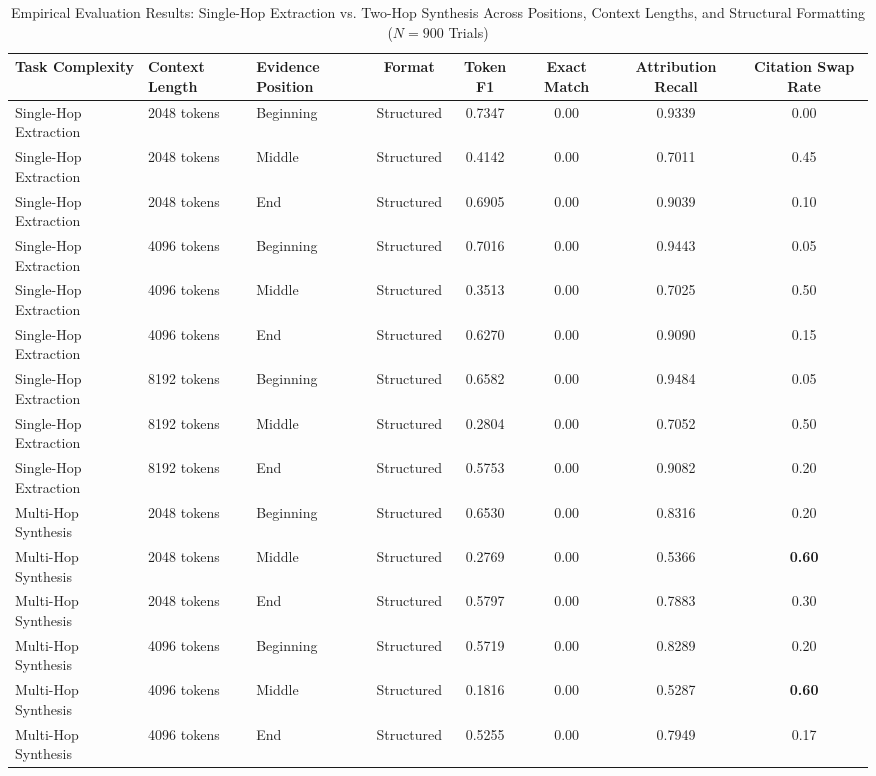\documentclass[manuscript,screen,oneside]{acmart}
\begin{document}
\begin{table}[t]
\centering
\caption{Empirical Evaluation Results: Single-Hop Extraction vs. Two-Hop Synthesis Across Positions, Context Lengths, and Structural Formatting ($N = 900$ Trials)}
\label{tab:results}
\small
\begin{tabular}{lllccccc}
\toprule
\textbf{Task Complexity} & \textbf{Context Length} & \textbf{Evidence Position} & \textbf{Format} & \textbf{Token F1} & \textbf{Exact Match} & \textbf{Attribution Recall} & \textbf{Citation Swap Rate} \\
\midrule
Single-Hop Extraction & 2048 tokens & Beginning & Structured & 0.7347 & 0.00 & 0.9339 & 0.00 \\
Single-Hop Extraction & 2048 tokens & Middle & Structured & 0.4142 & 0.00 & 0.7011 & 0.45 \\
Single-Hop Extraction & 2048 tokens & End & Structured & 0.6905 & 0.00 & 0.9039 & 0.10 \\
\cmidrule{2-8}
Single-Hop Extraction & 4096 tokens & Beginning & Structured & 0.7016 & 0.00 & 0.9443 & 0.05 \\
Single-Hop Extraction & 4096 tokens & Middle & Structured & 0.3513 & 0.00 & 0.7025 & 0.50 \\
Single-Hop Extraction & 4096 tokens & End & Structured & 0.6270 & 0.00 & 0.9090 & 0.15 \\
\cmidrule{2-8}
Single-Hop Extraction & 8192 tokens & Beginning & Structured & 0.6582 & 0.00 & 0.9484 & 0.05 \\
Single-Hop Extraction & 8192 tokens & Middle & Structured & 0.2804 & 0.00 & 0.7052 & 0.50 \\
Single-Hop Extraction & 8192 tokens & End & Structured & 0.5753 & 0.00 & 0.9082 & 0.20 \\
\midrule
Multi-Hop Synthesis & 2048 tokens & Beginning & Structured & 0.6530 & 0.00 & 0.8316 & 0.20 \\
Multi-Hop Synthesis & 2048 tokens & Middle & Structured & 0.2769 & 0.00 & 0.5366 & \textbf{0.60} \\
Multi-Hop Synthesis & 2048 tokens & End & Structured & 0.5797 & 0.00 & 0.7883 & 0.30 \\
\cmidrule{2-8}
Multi-Hop Synthesis & 4096 tokens & Beginning & Structured & 0.5719 & 0.00 & 0.8289 & 0.20 \\
Multi-Hop Synthesis & 4096 tokens & Middle & Structured & 0.1816 & 0.00 & 0.5287 & \textbf{0.60} \\
Multi-Hop Synthesis & 4096 tokens & End & Structured & 0.5255 & 0.00 & 0.7949 & 0.17 \\

\end{tabular}
\end{table}
\end{document}
